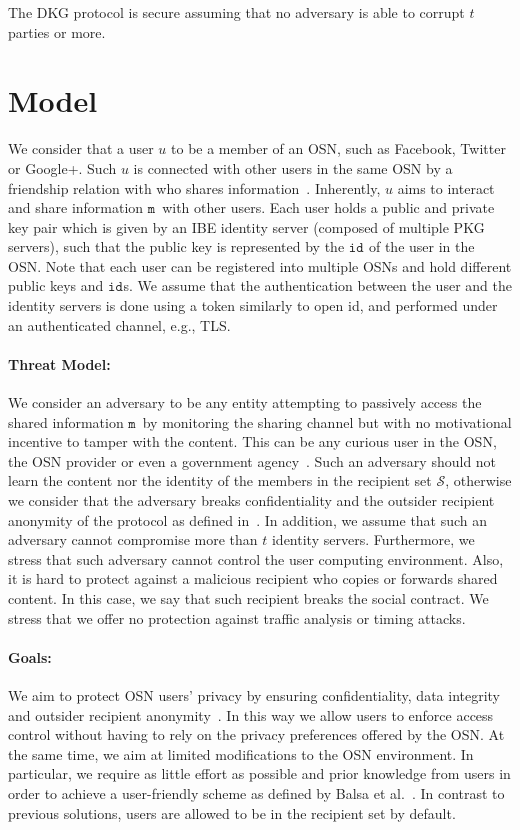 \documentclass{llncs}
\newcommand{\msg}{\ensuremath{\mathtt{m}}}
\newcommand{\id}[1]{\ensuremath{\mathtt{id}_{#1}}}
\begin{document}
The DKG protocol is secure assuming that no adversary is able to corrupt $t$ parties or more. 


\section{Model}\label{sec:model}
We consider that a user $u$ to be a member of an OSN, such as Facebook, Twitter or Google+. Such $u$ is connected with other users in the same OSN by a friendship relation with who shares information~\cite{boyd2008social}. Inherently, $u$ aims to interact and share information \msg\ with other users. Each user holds a public and private key pair which is given by an IBE identity server (composed of multiple PKG servers), such that the public key is represented by the \id{} of the user in the OSN. Note that each user can be registered into multiple OSNs and hold different public keys and \id{}s. We assume that the authentication between the user and the identity servers is done using a token similarly to open id, and performed under an authenticated channel, e.g., TLS.


\paragraph{Threat Model:}
We consider an adversary to be any entity attempting to passively access the shared information \msg\ by monitoring the sharing channel but with no motivational incentive to tamper with the content. This can be any curious user in the OSN, the OSN provider or even a government agency~\cite{prism}. Such an adversary should not learn the content nor the identity of the members in the recipient set $\mathcal{S}$, otherwise we consider that the adversary breaks confidentiality and the outsider recipient anonymity of the protocol as defined in~\cite{FazioOutsiderANOBE}.
In addition, we assume that such an adversary cannot compromise more than $t$ identity servers.  Furthermore, we stress that such adversary cannot control the user computing environment. Also, it is hard to protect against a malicious recipient who copies or forwards shared content. In this case, we say that such recipient breaks the social contract. We stress that we offer no protection against traffic analysis or timing attacks. 


\paragraph{Goals:}
We aim to protect OSN users' privacy by ensuring confidentiality, data integrity and outsider recipient anonymity~\cite{FazioOutsiderANOBE}. In this way we allow users to enforce access control without having to rely on the privacy preferences offered by the OSN. At the same time, we aim at limited modifications to the OSN environment. In particular, we require as little  effort as possible and prior knowledge from users in order to achieve a user-friendly scheme as defined by Balsa et al.~\cite{article2400}. In contrast to previous solutions, users are allowed to be in the recipient set by default.
\end{document}
